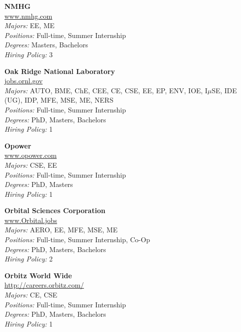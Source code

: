\documentclass[twoside]{article}
\begin{document}
\begin{center}
\begin{multicols}{3}
\begin{minipage}{.9\columnwidth}{\Large\bf NMHG }\\
	\url{www.nmhg.com}\\
	\emph{Majors:} EE, ME\\
	\emph{Positions:} Full-time, Summer Internship\\
	\emph{Degrees:} Masters, Bachelors\\
	\emph{Hiring Policy:} 3\\
\end{minipage}
 
\begin{minipage}{.9\columnwidth}{\Large\bf Oak Ridge National Laboratory }\\
	\url{jobs.ornl.gov}\\
	\emph{Majors:} AUTO, BME, ChE, CEE, CE, CSE, EE, EP, ENV, IOE, I$\mu$SE, IDE (UG), IDP, MFE, MSE, ME, NERS\\
	\emph{Positions:} Full-time, Summer Internship\\
	\emph{Degrees:} PhD, Masters, Bachelors\\
	\emph{Hiring Policy:} 1\\
\end{minipage}
 
\begin{minipage}{.9\columnwidth}{\Large\bf Opower }\\
	\url{www.opower.com}\\
	\emph{Majors:} CSE, EE\\
	\emph{Positions:} Full-time, Summer Internship\\
	\emph{Degrees:} PhD, Masters\\
	\emph{Hiring Policy:} 1\\
\end{minipage}
 
\begin{minipage}{.9\columnwidth}{\Large\bf Orbital Sciences Corporation }\\
	\url{www.Orbital.jobs}\\
	\emph{Majors:} AERO, EE, MFE, MSE, ME\\
	\emph{Positions:} Full-time, Summer Internship, Co-Op\\
	\emph{Degrees:} PhD, Masters, Bachelors\\
	\emph{Hiring Policy:} 2\\
\end{minipage}
 
\begin{minipage}{.9\columnwidth}{\Large\bf Orbitz World Wide }\\
	\url{http://careers.orbitz.com/}\\
	\emph{Majors:} CE, CSE\\
	\emph{Positions:} Full-time, Summer Internship\\
	\emph{Degrees:} PhD, Masters, Bachelors\\
	\emph{Hiring Policy:} 1\\
\end{minipage}
 

\end{multicols}
\end{center}
\end{document}
